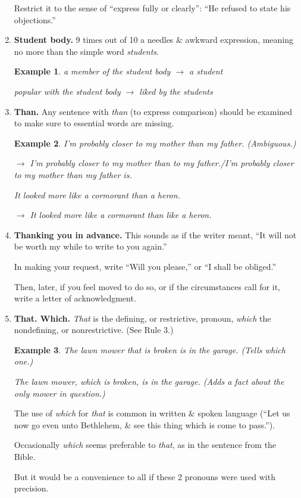 \documentclass{article}
\newtheorem{example}{Example}
\begin{document}
\begin{enumerate}
	Restrict it to the sense of ``express fully or clearly'': ``He refused to state his objections.''
	\item {\bf Student body.} 9 times out of 10 a needles \& awkward expression, meaning no more than the simple word {\it students}.
	\begin{example}
		a member of the student body $\to$ a student
		
		popular with the student body $\to$ liked by the students
	\end{example}
	\item {\bf Than.} Any sentence with {\it than} (to express comparison) should be examined to make sure to essential words are missing.
	\begin{example}
		I'm probably closer to my mother than my father. (Ambiguous.)
		
		$\to$ I'm probably closer to my mother than to my father./I'm probably closer to my mother than my father is.
		
		It looked more like a cormorant than a heron.
		
		$\to$ It looked more like a cormorant than like a heron.
	\end{example}
	\item {\bf Thanking you in advance.} This sounds as if the writer meant, ``It will not be worth my while to write to you again.''
	
	In making your request, write ``Will you please,'' or ``I shall be obliged.''
	
	Then, later, if you feel moved to do so, or if the circumstances call for it, write a letter of acknowledgment.
	\item {\bf That. Which.} {\it That} is the defining, or restrictive, pronoun, {\it which} the nondefining, or nonrestrictive. (See Rule 3.)
	\begin{example}
		The lawn mower that is broken is in the garage. (Tells which one.)
		
		The lawn mower, which is broken, is in the garage. (Adds a fact about the only mower in question.)
	\end{example}
	The use of {\it which} for {\it that} is common in written \& spoken language (``Let us now go even unto Bethlehem, \& see this thing which is come to pass.'').
	
	Occasionally {\it which} seems preferable to {\it that}, as in the sentence from the Bible.
	
	But it would be a convenience to all if these 2 pronouns were used with precision.
	

\end{enumerate}
\end{document}
